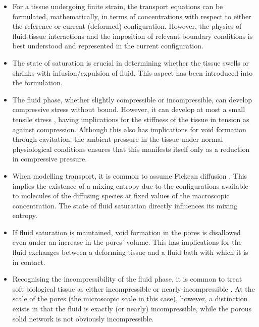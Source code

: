 \begin{itemize}
\item[\textbullet] For a tissue undergoing finite strain, the
  transport equations can be formulated, mathematically, in terms of
  concentrations with respect to either the reference or current
  (deformed) configuration. However, the physics of fluid-tissue
  interactions and the imposition of relevant boundary conditions is
  best understood and represented in the current configuration.

\item[\textbullet] The state of saturation is crucial in determining
  whether the tissue swells or shrinks with infusion/expulsion of
  fluid. This aspect has been introduced into the formulation.

\item[\textbullet] The fluid phase, whether slightly compressible or
  incompressible, can develop compressive stress without
  bound. However, it can develop at most a small tensile stress
  \citep{cavitationchris}, having implications for the stiffness of
  the tissue in tension as against compression. Although 
  this also has implications for void formation through cavitation,
  the ambient pressure in the tissue under normal physiological
  conditions ensures that this manifests itself only as a reduction in
  compressive pressure.

\item[\textbullet] When modelling transport, it is common to assume
  Fickean diffusion \citep{KuhlSteinmann:02}. This implies the
  existence of a mixing entropy due to the configurations available to
  molecules of the diffusing species at fixed values of the
  macroscopic concentration. The state of fluid saturation directly
  influences its mixing entropy.

\item[\textbullet] If fluid saturation is maintained, void formation
  in the pores is disallowed even under an increase in the pores'
  volume. This has implications for the fluid exchanges between a
  deforming tissue and a fluid bath with which it is in contact.

\item[\textbullet] Recognising the incompressibility of the fluid
  phase, it is common to treat soft biological tissue as either
  incompressible or nearly-incompressible \citep{Fung:1993}. At the
  scale of the pores (the microscopic scale in this case), however, a
  distinction exists in that the fluid is exactly (or nearly)
  incompressible, while the porous solid network is not obviously
  incompressible.


\end{itemize}
